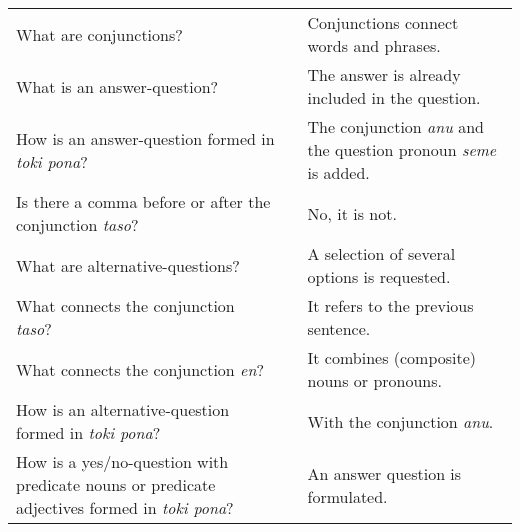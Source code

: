\begin{supertabular}{p{5,5cm}|ll}
    What are conjunctions?                                                                              &  & Conjunctions connect words and phrases.                                       \\
    What is an answer-question?                                                                         &  & The answer is already included in the question.                               \\
    How is an answer-question formed in \textit{toki pona}?                                             &  & The conjunction \textit{anu} and the question pronoun \textit{seme} is added. \\
    Is there a comma before or after the conjunction \textit{taso}?                                     &  & No, it is not.                                                                \\
    What are alternative-questions?                                                                     &  & A selection of several options is requested.                                  \\
    What connects the conjunction \textit{taso}?                                                        &  & It refers to the previous sentence.                                           \\
    What connects the conjunction \textit{en}?                                                          &  & It combines (composite) nouns or pronouns.                                    \\
    How is an alternative-question formed in \textit{toki pona}?                                        &  & With the conjunction \textit{anu}.                                            \\
    How is a yes/no-question with predicate nouns or predicate adjectives formed in \textit{toki pona}? &  & An answer question is formulated.                                             \\
\end{supertabular}

